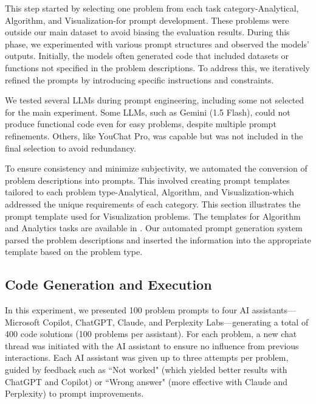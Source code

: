 \documentclass[conference]{IEEEtran}
\begin{document}
This step started by selecting one problem from each task category-Analytical, Algorithm, and Visualization-for prompt development. These problems were outside our main dataset to avoid biasing the evaluation results. During this phase, we experimented with various prompt structures and observed the models' outputs. Initially, the models often generated code that included datasets or functions not specified in the problem descriptions. To address this, we iteratively refined the prompts by introducing specific instructions and constraints.

We tested several LLMs during prompt engineering, including some not selected for the main experiment. Some LLMs, such as Gemini (1.5 Flash), could not produce functional code even for easy problems, despite multiple prompt refinements. Others, like YouChat Pro, was capable but was not included in the final selection to avoid redundancy.

To ensure consistency and minimize subjectivity, we automated the conversion of problem descriptions into prompts. This involved creating prompt templates tailored to each problem type-Analytical, Algorithm, and Visualization-which addressed the unique requirements of each category. %
This section illustrates the prompt template used for Visualization problems. The templates for Algorithm and Analytics tasks are available in \cite{EASER_LLM4Code_Study4_2023}. Our automated prompt generation system parsed the problem descriptions and inserted the information into the appropriate template based on the problem type.

\subsection{Code Generation and Execution} \label{sec:generation}
In this experiment, we presented 100 problem prompts to four AI assistants—Microsoft Copilot, ChatGPT, Claude, and Perplexity Labs—generating a total of 400 code solutions (100 problems per assistant). For each problem, a new chat thread was initiated with the AI assistant to ensure no influence from previous interactions. Each AI assistant was given up to three attempts per problem, guided by feedback such as ``Not worked" (which yielded better results with ChatGPT and Copilot) or ``Wrong answer" (more effective with Claude and Perplexity) to prompt improvements.
\end{document}
